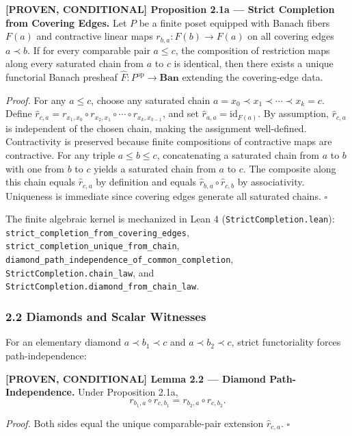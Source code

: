 \documentclass[
  english,
  10pt,
  a4paper,
]{article}
\renewenvironment{quote}
  {\begin{leftbar}\small}
  {\end{leftbar}}
\begin{document}
\begin{quote}
\textbf{{[}PROVEN, CONDITIONAL{]} Proposition 2.1a --- Strict Completion
from Covering Edges.} Let \(P\) be a finite poset equipped with Banach
fibers \(F(a)\) and contractive linear maps \(r_{b,a}:F(b)\to F(a)\) on
all covering edges \(a\prec b\). If for every comparable pair
\(a\le c\), the composition of restriction maps along every saturated
chain from \(a\) to \(c\) is identical, then there exists a unique
functorial Banach presheaf \(\widehat F:P^{\mathrm{op}}\to\mathbf{Ban}\)
extending the covering-edge data.

\emph{Proof.} For any \(a\le c\), choose any saturated chain
\(a=x_0\prec x_1\prec \cdots \prec x_k=c\). Define
\(\widehat r_{c,a}=r_{x_1,x_0}\circ r_{x_2,x_1}\circ \cdots \circ r_{x_k,x_{k-1}}\),
and set \(\widehat r_{a,a}=\mathrm{id}_{F(a)}\). By assumption,
\(\widehat r_{c,a}\) is independent of the chosen chain, making the
assignment well-defined. Contractivity is preserved because finite
compositions of contractive maps are contractive. For any triple
\(a\le b\le c\), concatenating a saturated chain from \(a\) to \(b\)
with one from \(b\) to \(c\) yields a saturated chain from \(a\) to
\(c\). The composite along this chain equals \(\widehat r_{c,a}\) by
definition and equals \(\widehat r_{b,a}\circ\widehat r_{c,b}\) by
associativity. Uniqueness is immediate since covering edges generate all
saturated chains. \(\square\)
\end{quote}

The finite algebraic kernel is mechanized in Lean 4
(\texttt{StrictCompletion.lean}):
\nolinkurl{strict_completion_from_covering_edges},
\nolinkurl{strict_completion_unique_from_chain},
\nolinkurl{diamond_path_independence_of_common_completion},
\nolinkurl{StrictCompletion.chain_law}, and
\nolinkurl{StrictCompletion.diamond_from_chain_law}.

\subsubsection{2.2 Diamonds and Scalar
Witnesses}\label{diamonds-and-scalar-witnesses}

For an elementary diamond \(a\prec b_1\prec c\) and
\(a\prec b_2\prec c\), strict functoriality forces path-independence:

\begin{quote}
\textbf{{[}PROVEN, CONDITIONAL{]} Lemma 2.2 --- Diamond
Path-Independence.} Under Proposition 2.1a, \[
r_{b_1,a}\circ r_{c,b_1} = r_{b_2,a}\circ r_{c,b_2}.
\]

\emph{Proof.} Both sides equal the unique comparable-pair extension
\(\widehat r_{c,a}\). \(\square\)
\end{quote}
\end{document}
